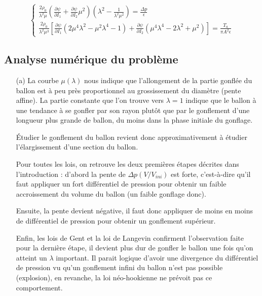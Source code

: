 \documentclass[a4paper,11pt]{article}
\newcommand{\FRAC}{\displaystyle\frac}
\begin{document}
$$
\begin{cases}
\FRAC{2\rho_0}{\lambda^2\mu} \left (\FRAC{\partial\psi}{\partial I_1} + \FRAC{\partial\psi}{\partial I_2} \mu^2 \right) \left ( \lambda^2 - \FRAC{1}{\lambda^2\mu^2} \right) = \FRAC{\Delta p}{\epsilon} \\
\FRAC{2\rho_0}{\lambda^2\mu^3} \left [\FRAC{\partial\psi}{\partial I_1} (2\mu^4\lambda^2-\mu^2\lambda^4-1) + \FRAC{\partial\psi}{\partial I_2} (\mu^4 \lambda^4 - 2\lambda^2 + \mu^2) \right] = \FRAC{T_a}{\pi A^2 \epsilon}
\end{cases}
$$

\subsection{Analyse numérique du problème}
\begin{enumerate}
\item[(a)]
La courbe $\mu(\lambda)$ nous indique que l'allongement de la partie gonflée du ballon est à peu près proportionnel au grossissement du diamètre (pente affine). La partie constante que l'on trouve vers $\lambda = 1$ indique que le ballon à une tendance à se gonfler par son rayon plutôt que par le gonflement d'une longueur plus grande de ballon, du moins dans la phase initiale du gonflage.

\hspace{0.8cm} Étudier le gonflement du ballon revient donc approximativement à étudier l'élargissement d'une section du ballon.

\hspace{0.8cm} Pour toutes les lois, on retrouve les deux premières étapes décrites dans l'introduction : d'abord la pente de $\Delta p (V/V_{ini})$ est forte, c'est-à-dire qu'il faut appliquer un fort différentiel de pression pour obtenir un faible accroissement du volume du ballon (un faible gonflage donc).

\hspace{0.8cm}Ensuite, la pente devient négative, il faut donc appliquer de moins en moins de différentiel de pression pour obtenir un gonflement supérieur.

\hspace{0.8cm}Enfin, les lois de Gent et la loi de Langevin confirment l'observation faite pour la dernière étape, il devient plus dur de gonfler le ballon une fois qu'on atteint un $\lambda$ important. Il parait logique d'avoir une divergence du différentiel de pression vu qu'un gonflement infini du ballon n'est pas possible (explosion), en revanche, la loi néo-hookienne ne prévoit pas ce comportement.


\end{enumerate}
\end{document}
